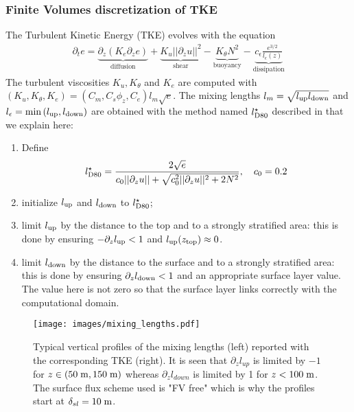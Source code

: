 \subsubsection{Finite Volumes discretization of TKE}
\label{sec:ND_StratifiedCase_TKE}
The Turbulent Kinetic Energy (TKE) evolves with the equation
\begin{equation}
\label{eq:ND_StratifiedCase_TKE}
    \begin{aligned}
    \partial_t e =
    \underbrace{\partial_z \left(K_e
    \partial_z e\right)}_{\text{diffusion}}
    + \underbrace{K_u ||\partial_z u||^2}_{\text{shear}} 
    - \underbrace{K_{\theta} N^2 }_{\text{buoyancy}}
    - \underbrace{c_{\epsilon}
    \frac{e^{3/2}}{l_{\epsilon}(z)}}_{\text{dissipation}}
    \end{aligned}
\end{equation}
The turbulent viscosities $K_u, K_{\theta}$ and $K_e$ are computed
with $(K_u, K_\theta, K_e) = (C_m , C_s \phi_z, C_e)l_m \sqrt{e}$.
The mixing lengths $l_m = \sqrt{l_{\rm up} l_{\rm down}}$ and
$l_\epsilon = \min{(l_{\rm up}, l_{\rm down})}$
are obtained with the method named $l^\star_{\rm D80}$ described in
\cite{lemarie_simplified_2021} that we explain here:
\begin{enumerate}
	\item Define
		\begin{equation}
			\label{eq:ND_StratifiedCase_lD80}
			l^\star_{\rm D80} = \frac{2\sqrt{e}}
			{c_0 ||\partial_z u|| + \sqrt{
				c_0^2 ||\partial_z u||^2 + 2 N^2
			}}, ~~~ c_0=0.2
		\end{equation}
	\item initialize $l_{\rm up}$ and $l_{\rm down}$ to
		$l^\star_{\rm D80}$;
	\item limit $l_{\rm up}$ by the distance to the top and to
		a strongly stratified area: this is done by
		ensuring $-\partial_z l_{\rm up} < 1$ and
		$l_{\rm up}(z_{\rm top}) \approx 0$.
	\item limit $l_{\rm down}$ by the distance to the surface
		and to a strongly stratified area: this is done by
		ensuring $\partial_z l_{\rm down} < 1$ and
		an appropriate surface layer value.
		The value here is not zero so that the surface layer
		links correctly with the computational domain.
\end{enumerate}
\begin{figure}
	\centering
	\texttt{[image: images/mixing\_lengths.pdf]}
	\caption{Typical vertical profiles of the mixing lengths
	(left) reported with the corresponding TKE (right).
	It is seen that $\partial_z l_{up}$ is limited by $-1$
	for $z\in (50 \; {\rm m}, 150\; {\rm m})$ whereas
	$\partial_z l_{down}$ is limited by 1 for $z<100 \;{\rm m}$.
	The surface flux scheme used is "FV free" which is why the
	profiles start at $\delta_{sl} = 10\;{\rm m}$.}
	\label{fig:ND_StratifiedCase_mixing_lengths}
\end{figure}
